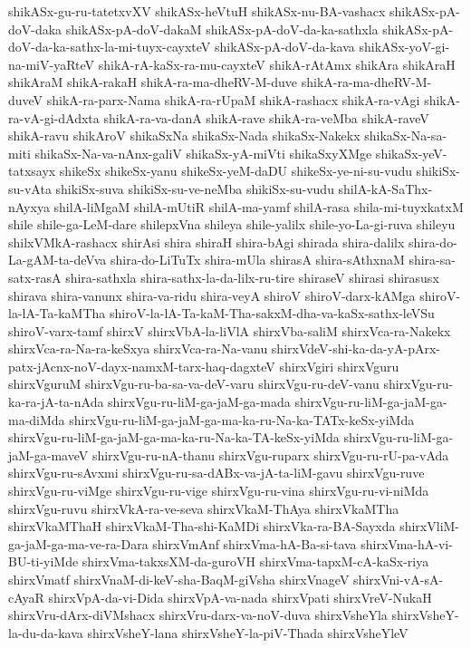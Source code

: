 {shikASx-gu-ru-tatetxvXV
shikASx-heVtuH
shikASx-nu-BA-vashacx
shikASx-pA-doV-daka
shikASx-pA-doV-dakaM
shikASx-pA-doV-da-ka-sathxla
shikASx-pA-doV-da-ka-sathx-la-mi-tuyx-cayxteV
shikASx-pA-doV-da-kava
shikASx-yoV-gi-na-miV-yaRteV
shikA-rA-kaSx-ra-mu-cayxteV
shikA-rAtAmx
shikAra
shikAraH
shikAraM
shikA-rakaH
shikA-ra-ma-dheRV-M-duve
shikA-ra-ma-dheRV-M-duveV
shikA-ra-parx-Nama
shikA-ra-rUpaM
shikA-rashacx
shikA-ra-vAgi
shikA-ra-vA-gi-dAdxta
shikA-ra-va-danA
shikA-rave
shikA-ra-veMba
shikA-raveV
shikA-ravu
shikAroV
shikaSxNa
shikaSx-Nada
shikaSx-Nakekx
shikaSx-Na-sa-miti
shikaSx-Na-va-nAnx-galiV
shikaSx-yA-miVti
shikaSxyXMge
shikaSx-yeV-tatxsayx
shikeSx
shikeSx-yanu
shikeSx-yeM-daDU
shikeSx-ye-ni-su-vudu
shikiSx-su-vAta
shikiSx-suva
shikiSx-su-ve-neMba
shikiSx-su-vudu
shilA-kA-SaThx-nAyxya
shilA-liMgaM
shilA-mUtiR
shilA-ma-yamf
shilA-rasa
shila-mi-tuyxkatxM
shile
shile-ga-LeM-dare
shilepxVna
shileya
shile-yalilx
shile-yo-La-gi-ruva
shileyu
shilxVMkA-rashacx
shirAsi
shira
shiraH
shira-bAgi
shirada
shira-dalilx
shira-do-La-gAM-ta-deVva
shira-do-LiTuTx
shira-mUla
shirasA
shira-sAthxnaM
shira-sa-satx-rasA
shira-sathxla
shira-sathx-la-da-lilx-ru-tire
shiraseV
shirasi
shirasusx
shirava
shira-vanunx
shira-va-ridu
shira-veyA
shiroV
shiroV-darx-kAMga
shiroV-la-lA-Ta-kaMTha
shiroV-la-lA-Ta-kaM-Tha-sakxM-dha-va-kaSx-sathx-leVSu
shiroV-varx-tamf
shirxV
shirxVbA-la-liVlA
shirxVba-saliM
shirxVca-ra-Nakekx
shirxVca-ra-Na-ra-keSxya
shirxVca-ra-Na-vanu
shirxVdeV-shi-ka-da-yA-pArx-patx-jAcnx-noV-dayx-namxM-tarx-haq-dagxteV
shirxVgiri
shirxVguru
shirxVguruM
shirxVgu-ru-ba-sa-va-deV-varu
shirxVgu-ru-deV-vanu
shirxVgu-ru-ka-ra-jA-ta-nAda
shirxVgu-ru-liM-ga-jaM-ga-mada
shirxVgu-ru-liM-ga-jaM-ga-ma-diMda
shirxVgu-ru-liM-ga-jaM-ga-ma-ka-ru-Na-ka-TATx-keSx-yiMda
shirxVgu-ru-liM-ga-jaM-ga-ma-ka-ru-Na-ka-TA-keSx-yiMda
shirxVgu-ru-liM-ga-jaM-ga-maveV
shirxVgu-ru-nA-thanu
shirxVgu-ruparx
shirxVgu-ru-rU-pa-vAda
shirxVgu-ru-sAvxmi
shirxVgu-ru-sa-dABx-va-jA-ta-liM-gavu
shirxVgu-ruve
shirxVgu-ru-viMge
shirxVgu-ru-vige
shirxVgu-ru-vina
shirxVgu-ru-vi-niMda
shirxVgu-ruvu
shirxVkA-ra-ve-seva
shirxVkaM-ThAya
shirxVkaMTha
shirxVkaMThaH
shirxVkaM-Tha-shi-KaMDi
shirxVka-ra-BA-Sayxda
shirxVliM-ga-jaM-ga-ma-ve-ra-Dara
shirxVmAnf
shirxVma-hA-Ba-si-tava
shirxVma-hA-vi-BU-ti-yiMde
shirxVma-takxsXM-da-guroVH
shirxVma-tapxM-cA-kaSx-riya
shirxVmatf
shirxVnaM-di-keV-sha-BaqM-giVsha
shirxVnageV
shirxVni-vA-sA-cAyaR
shirxVpA-da-vi-Dida
shirxVpA-va-nada
shirxVpati
shirxVreV-NukaH
shirxVru-dArx-diVMshacx
shirxVru-darx-va-noV-duva
shirxVsheYla
shirxVsheY-la-du-da-kava
shirxVsheY-lana
shirxVsheY-la-piV-Thada
shirxVsheYleV
}

